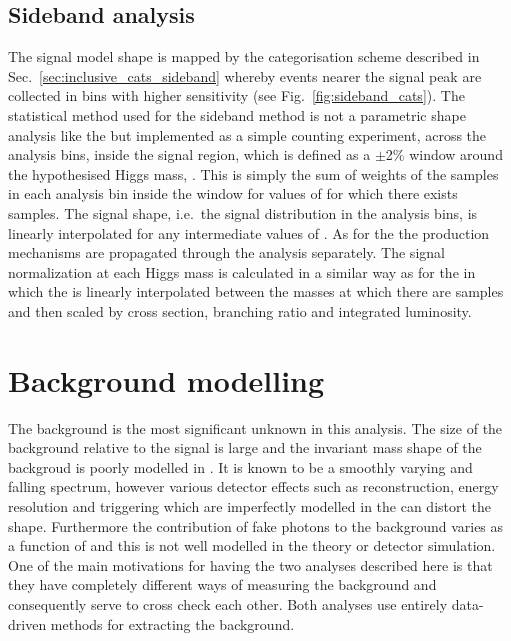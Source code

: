 \subsection{Sideband analysis}
\label{sec:sig_sideband}

The signal model shape is mapped by the categorisation scheme described in Sec.~\ref{sec:inclusive_cats_sideband} whereby events nearer the signal peak are collected in bins with higher sensitivity (see Fig.~\ref{fig:sideband_cats}). The statistical method used for the sideband method is not a parametric shape analysis like the \MFM but implemented as a simple counting experiment, across the analysis bins, inside the signal region, which is defined as a $\pm$2\% window around the hypothesised Higgs mass, \mH. This is simply the sum of weights of the \MC samples in each analysis bin inside the window for values of \mH for which there exists \MC samples. The signal shape, i.e.~the signal distribution in the analysis bins, is linearly interpolated for any intermediate values of \mH. As for the \MFM the \SM production mechanisms are propagated through the analysis separately. The signal normalization at each Higgs mass is calculated in a similar way as for the \MFM in which the \ea is linearly interpolated between the masses at which there are \MC samples and then scaled by cross section, branching ratio and integrated luminosity. 

\section{Background modelling}
\label{sec:background_model}

The background is the most significant unknown in this analysis. The size of the background relative to the signal is large and the invariant mass shape of the backgroud is poorly modelled in \MC. It is known to be a smoothly varying and falling spectrum, however various detector effects such as reconstruction, energy resolution and triggering which are imperfectly modelled in the \MC can distort the shape. Furthermore the contribution of fake photons to the background varies as a function of \mgg and this is not well modelled in the theory or detector simulation. One of the main motivations for having the two analyses described here is that they have completely different ways of measuring the background and consequently serve to cross check each other. Both analyses use entirely data-driven methods for extracting the background.  

